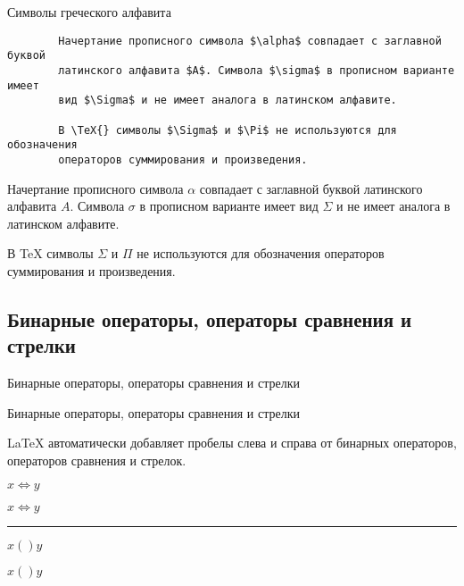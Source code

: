 \begin{frame}[fragile]{Символы греческого алфавита}

	\begin{verbatim}
		Начертание прописного символа $\alpha$ совпадает с заглавной буквой
		латинского алфавита $A$. Символа $\sigma$ в прописном варианте имеет
		вид $\Sigma$ и не имеет аналога в латинском алфавите. 
		
		В \TeX{} символы $\Sigma$ и $\Pi$ не используются для обозначения
		операторов суммирования и произведения. 
	\end{verbatim}

	Начертание прописного символа $\alpha$ совпадает с заглавной буквой
	латинского алфавита $A$. Символа $\sigma$ в прописном варианте имеет
	вид $\Sigma$ и не имеет аналога в латинском алфавите. 
	
	В \TeX{} символы $\Sigma$ и $\Pi$ не используются для обозначения
	операторов суммирования и произведения.
\end{frame}

\subsection{Бинарные операторы, операторы сравнения и стрелки}

\begin{frame}[fragile=singleslide]{Бинарные операторы, операторы сравнения и стрелки}
	\begin{center}
		
	\end{center}
\end{frame}

\begin{frame}{Бинарные операторы, операторы сравнения и стрелки}
	\footnotesize
	\begin{center}
		
	\end{center}
	
	\normalsize
	
	\LaTeX{} автоматически добавляет пробелы слева и справа от бинарных операторов, операторов сравнения и стрелок.
	
	\begin{minipage}{0.49\textwidth}
		\texttt{$x\Leftrightarrow y$}
	\end{minipage}
	\begin{minipage}{0.49\textwidth}
		\Large
		$x\Leftrightarrow y$
	\end{minipage}
	
	\noindent\rule{\textwidth}{1pt}
	\begin{minipage}{0.49\textwidth}
		\texttt{$x()y$}
	\end{minipage}
	\begin{minipage}{0.49\textwidth}
		\Large
		$x()y$
	\end{minipage}
\end{frame}

